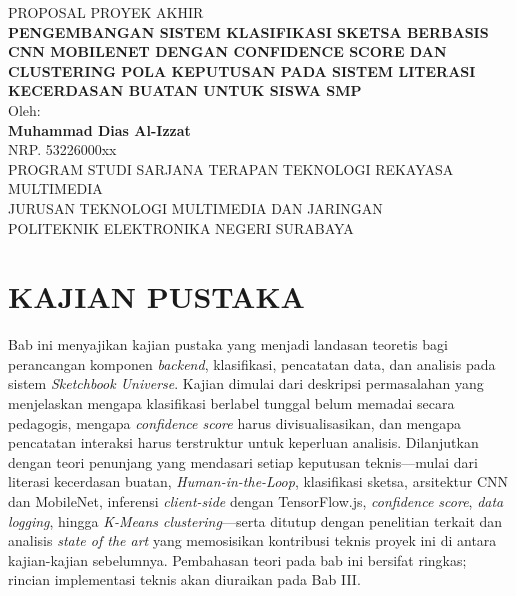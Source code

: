 \documentclass[12pt,a4paper,oneside,openany]{report}
\begin{document}

\begin{titlepage}
\centering
\vspace*{2cm}
{\fontsize{14pt}{16pt}\selectfont PROPOSAL PROYEK AKHIR}\\[1cm]
{\fontsize{14pt}{18pt}\selectfont\bfseries\MakeUppercase{Pengembangan Sistem Klasifikasi Sketsa Berbasis CNN MobileNet dengan Confidence Score dan Clustering Pola Keputusan pada Sistem Literasi Kecerdasan Buatan untuk Siswa SMP}}\\[2cm]
{\fontsize{12pt}{14pt}\selectfont Oleh:}\\[0.3cm]
{\fontsize{12pt}{14pt}\selectfont\bfseries Muhammad Dias Al-Izzat}\\[0.2cm]
{\fontsize{12pt}{14pt}\selectfont NRP. 53226000xx}\\[2cm]
{\fontsize{12pt}{14pt}\selectfont PROGRAM STUDI SARJANA TERAPAN TEKNOLOGI REKAYASA MULTIMEDIA}\\[0.2cm]
{\fontsize{12pt}{14pt}\selectfont JURUSAN TEKNOLOGI MULTIMEDIA DAN JARINGAN}\\[0.2cm]
{\fontsize{12pt}{14pt}\selectfont POLITEKNIK ELEKTRONIKA NEGERI SURABAYA}\\[0.2cm]
{\fontsize{12pt}{14pt}}
\end{titlepage}

\chapter{KAJIAN PUSTAKA}
\label{chap:bab2}

Bab ini menyajikan kajian pustaka yang menjadi landasan teoretis bagi perancangan komponen \textit{backend}, klasifikasi, pencatatan data, dan analisis pada sistem \textit{Sketchbook Universe}. Kajian dimulai dari deskripsi permasalahan yang menjelaskan mengapa klasifikasi berlabel tunggal belum memadai secara pedagogis, mengapa \textit{confidence score} harus divisualisasikan, dan mengapa pencatatan interaksi harus terstruktur untuk keperluan analisis. Dilanjutkan dengan teori penunjang yang mendasari setiap keputusan teknis---mulai dari literasi kecerdasan buatan, \textit{Human-in-the-Loop}, klasifikasi sketsa, arsitektur CNN dan MobileNet, inferensi \textit{client-side} dengan TensorFlow.js, \textit{confidence score}, \textit{data logging}, hingga \textit{K-Means clustering}---serta ditutup dengan penelitian terkait dan analisis \textit{state of the art} yang memosisikan kontribusi teknis proyek ini di antara kajian-kajian sebelumnya. Pembahasan teori pada bab ini bersifat ringkas; rincian implementasi teknis akan diuraikan pada Bab III.
\end{document}
